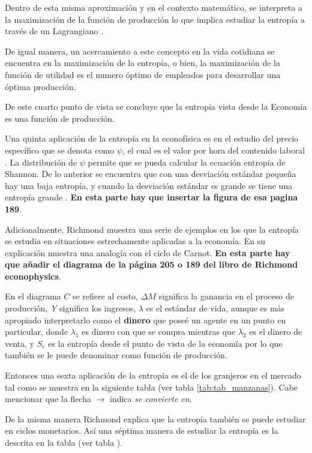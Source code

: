 Dentro de esta misma aproximación y en el contexto matemático, se interpreta a la maximización de la función de producción lo que implica estudiar la entropía a través de un Lagrangiano \citep[][página 205]{richmond} \citep[][página 150]{cottrell_classical_2009}.

De igual manera, un acercamiento a este concepto en la vida cotidiana se encuentra en la maximización  de la entropía, o bien, la maximización de la función de utilidad es el numero óptimo de empleados para desarrollar una óptima producción.

De este cuarto punto de vista se concluye que la entropía vista desde la Economía es una función de producción. 

Una quinta aplicación de la entropía en la econofísica es en el estudio del precio específico que se denota como $\psi$, el cual es el valor por hora del contenido laboral \citep[][]{cottrell_classical_2009}. La distribución de $\psi$ permite que se pueda calcular la ecuación entropía de Shannon. De lo anterior se encuentra que con una desviación estándar pequeña hay una baja entropía, y cuando la desviación estándar es grande se tiene una entropía grande \citep[][pagina 189]{cottrell_classical_2009}. \textbf{En esta parte hay que insertar la figura de esa pagina 189}.

Adicionalmente, Richmond muestra una serie de ejemplos en los que la entropía se estudia en situaciones estrechamente aplicadas a la economía. En su explicación muestra una analogía con el ciclo de Carnot. \textbf{En esta parte hay que añadir el diagrama de la página 205 o 189 del libro de Richmond econophysics}. 


En el diagrama $C$ se refiere al costo, $\Delta M$ significa la ganancia en el proceso de producción,  \textit{Y} significa los ingresos, $\lambda$ es el estándar de vida, aunque es más apropiado interpretarlo como el \textbf{dinero} que poseé un agente en un punto en particular, donde $\lambda_{1}$ es dinero con que se compra mientras que $\lambda_{2}$ es el dinero de venta, y $S_e$ es la entropía desde el punto de vista de la economía por lo que también se le puede denominar como función de producción.

Entonces una sexta aplicación de la entropía es el de los granjeros en el mercado tal como se muestra en la siguiente tabla (ver tabla \ref{tab:tab_manzanas}). Cabe mencionar que la flecha $\rightarrow
$ indica \textit{se convierte en}.  

De la misma manera Richmond explica que la entropía también se puede estudiar en ciclos monetarios. Así una séptima manera de estudiar la entropía es la descrita en la tabla (ver tabla ). 

